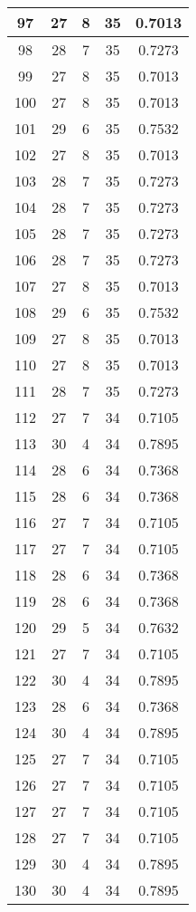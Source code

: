 \documentclass[letterpaper, 12pt]{article}
\begin{document}
\begin{longtable}{|c|c|c|c|c|}
\hline
97 & 27 & 8 & 35 & 0.7013 \\
\hline
98 & 28 & 7 & 35 & 0.7273 \\
\hline
99 & 27 & 8 & 35 & 0.7013 \\
\hline
100 & 27 & 8 & 35 & 0.7013 \\
\hline
101 & 29 & 6 & 35 & 0.7532 \\
\hline
102 & 27 & 8 & 35 & 0.7013 \\
\hline
103 & 28 & 7 & 35 & 0.7273 \\
\hline
104 & 28 & 7 & 35 & 0.7273 \\
\hline
105 & 28 & 7 & 35 & 0.7273 \\
\hline
106 & 28 & 7 & 35 & 0.7273 \\
\hline
107 & 27 & 8 & 35 & 0.7013 \\
\hline
108 & 29 & 6 & 35 & 0.7532 \\
\hline
109 & 27 & 8 & 35 & 0.7013 \\
\hline
110 & 27 & 8 & 35 & 0.7013 \\
\hline
111 & 28 & 7 & 35 & 0.7273 \\
\hline
112 & 27 & 7 & 34 & 0.7105 \\
\hline
113 & 30 & 4 & 34 & 0.7895 \\
\hline
114 & 28 & 6 & 34 & 0.7368 \\
\hline
115 & 28 & 6 & 34 & 0.7368 \\
\hline
116 & 27 & 7 & 34 & 0.7105 \\
\hline
117 & 27 & 7 & 34 & 0.7105 \\
\hline
118 & 28 & 6 & 34 & 0.7368 \\
\hline
119 & 28 & 6 & 34 & 0.7368 \\
\hline
120 & 29 & 5 & 34 & 0.7632 \\
\hline
121 & 27 & 7 & 34 & 0.7105 \\
\hline
122 & 30 & 4 & 34 & 0.7895 \\
\hline
123 & 28 & 6 & 34 & 0.7368 \\
\hline
124 & 30 & 4 & 34 & 0.7895 \\
\hline
125 & 27 & 7 & 34 & 0.7105 \\
\hline
126 & 27 & 7 & 34 & 0.7105 \\
\hline
127 & 27 & 7 & 34 & 0.7105 \\
\hline
128 & 27 & 7 & 34 & 0.7105 \\
\hline
129 & 30 & 4 & 34 & 0.7895 \\
\hline
130 & 30 & 4 & 34 & 0.7895 \\

\end{longtable}
\end{document}
